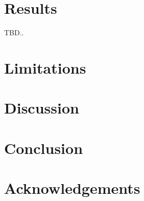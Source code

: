 \documentclass[sigplan,nonacm,review]{acmart}
\begin{document}
%
%
%
%


\section{Results}\label{sec:results}
TBD..

\section{Limitations}\label{sec:limitations}


\section{Discussion}\label{sec:discussion}


\section{Conclusion}\label{sec:conclusion}


\section{Acknowledgements}\label{sec:acks}

{\raggedright

}
\vfill\eject
\end{document}
